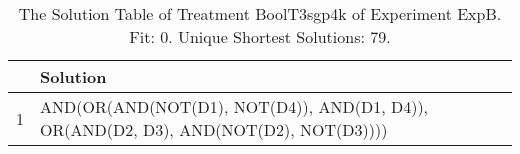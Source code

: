\begin{table}[ht]
\centering
\begin{tabular}{rp{9cm}}
  \hline
 & Solution \\ 
  \hline
1 & AND(OR(AND(NOT(D1), NOT(D4)), AND(D1, D4)), OR(AND(D2, D3), AND(NOT(D2), NOT(D3)))) \\ 
   \hline
\end{tabular}
\caption{The Solution Table of Treatment BoolT3sgp4k of Experiment ExpB. Fit: 0. Unique Shortest Solutions: 79.} 
\end{table}
